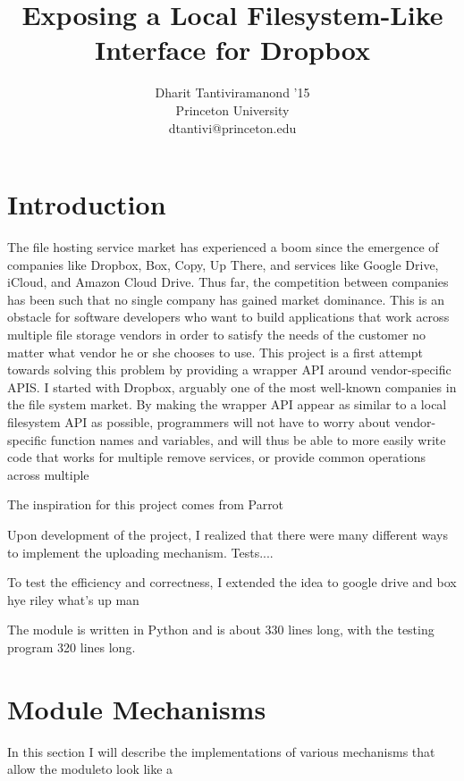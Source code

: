 \documentclass[pageno]{jpaper}
\begin{document}
\title{Exposing a Local Filesystem-Like Interface for Dropbox}
\author{Dharit Tantiviramanond '15\\ Princeton University \\ dtantivi@princeton.edu}

\date{}
\maketitle

\thispagestyle{empty}

\begin{abstract}
\end{abstract}

\section{Introduction}
\label{sec:intro}
The file hosting service market has experienced a boom since the emergence of companies like Dropbox, Box, Copy, Up There, and services like Google Drive, iCloud, and Amazon Cloud Drive. Thus far, the competition between companies has been such that no single company has gained market dominance. This is an obstacle for software developers who want to build applications that work across multiple file storage vendors in order to satisfy the needs of the customer no matter what vendor he or she chooses to use. This project is a first attempt towards solving this problem by providing a wrapper API around vendor-specific APIS. I started with Dropbox, arguably one of the most well-known companies in the file system market. By making the wrapper API appear as similar to a local filesystem API as possible, programmers will not have to worry about vendor-specific function names and variables, and will thus be able to more easily write code that works for multiple remove services, or provide common operations across multiple 

The inspiration for this project comes from Parrot

Upon development of the project, I realized that there were many different ways to implement the uploading mechanism. Tests....

To test the efficiency and correctness, I extended the idea to google drive and box hye riley what's up man

The module is written in Python and is about 330 lines long, with the testing program 320 lines long.
\section{Module Mechanisms}
\label{sec:mechanism}
In this section I will describe the implementations of various mechanisms that allow the moduleto look like a 
\end{document}
